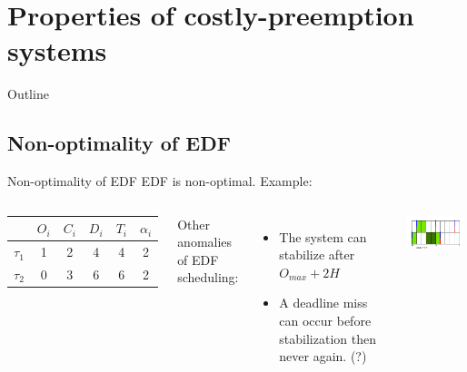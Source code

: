 \documentclass{beamer}
\begin{document}
\section{Properties of costly-preemption systems}

\begin{frame}{Outline}
    \tableofcontents[currentsection]
\end{frame}


\subsection{Non-optimality of EDF}

\begin{frame}{Non-optimality of EDF}
    EDF is non-optimal. Example:

    \begin{columns}[c]
        \begin{center}
            \begin{tabular}{|r|c|c|c|c|c|}
                \hline
                            & $O_i$ & $C_i$ & $D_i$ & $T_i$ & $\alpha_i$ \\ \hline
                $\tau_1$    & 1     & 2     & 4     & 4     & 2     \\ \hline
                $\tau_2$    & 0     & 3     & 6     & 6     & 2     \\ \hline
            \end{tabular}
        \end{center}
        Other anomalies of EDF scheduling:
        \begin{itemize}
            \item The system can stabilize after $O_{max} + 2H$
            \item A deadline miss can occur before stabilization then never again. (?)
        \end{itemize}
        \includegraphics[width=0.9\textwidth]{figs/edfNonOptimal_EDF.png}


\end{columns}
\end{frame}
\end{document}
